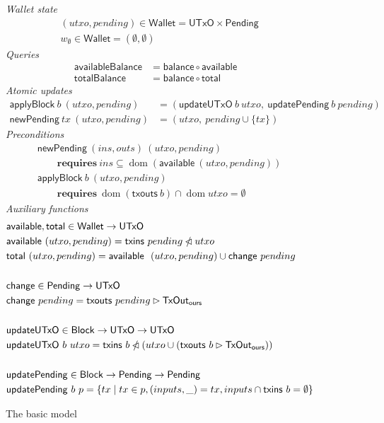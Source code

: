 \documentclass{article}
\newcommand{\restrictdom}{\lhd}
\newcommand{\subtractdom}{\mathbin{\slashed{\restrictdom}}}
\newcommand{\restrictrange}{\rhd}
\DeclareMathOperator{\dom}{dom}
\numberwithin{equation}{lemma}
\begin{document}
\begin{figure}
\emph{Wallet state}
\begin{align*}
& (\mathit{utxo}, \mathit{pending}) \in \mathsf{Wallet} = \mathsf{UTxO} \times \mathsf{Pending} \\
& w_\emptyset \in \mathsf{Wallet} = (\emptyset, \emptyset)
\end{align*}
%
\emph{Queries}
%
\begin{equation*}
\begin{split}
\mathsf{availableBalance} & = \mathsf{balance} \circ \mathsf{available} \\
\mathsf{totalBalance}     & = \mathsf{balance} \circ \mathsf{total}
\end{split}
\end{equation*}
%
\emph{Atomic updates}
%
\begin{align*}
    \mathsf{applyBlock} ~ b ~ (utxo, pending)
& = (\mathsf{updateUTxO} ~ b ~ utxo, ~ \mathsf{updatePending} ~ b ~ pending)
\\
  \mathsf{newPending} ~ tx ~ (utxo, pending)
& = ( utxo, ~ pending \cup \{ tx \} )
\end{align*}
%
\emph{Preconditions}
%
\begin{align*}
& \mathsf{newPending} ~ (\mathit{ins}, \mathit{outs}) ~ (\mathit{utxo}, \mathit{pending}) \\
& \qquad \mathbf{requires~} \mathit{ins} \subseteq \dom (\mathsf{available} ~ (utxo, pending))
\\
& \mathsf{applyBlock} ~ b ~ (\mathit{utxo}, \mathit{pending}) \\
& \qquad \mathbf{requires~} \dom (\mathsf{txouts} ~ b) \cap \dom \mathit{utxo} = \emptyset
\end{align*}
%
\emph{Auxiliary functions}
%
\begin{align*}
& \mathsf{available}, \mathsf{total} \in \mathsf{Wallet} \to \mathsf{UTxO} \\
& \mathsf{available} ~ (utxo, pending) = \mathsf{txins} ~ pending \subtractdom utxo \\
& \mathsf{total} ~ (utxo, pending) = \mathsf{available} ~ ~ (utxo, pending) \cup \mathsf{change} ~ pending \\
\\
& \mathsf{change} \in \mathsf{Pending} \to \mathsf{UTxO} \\
& \mathsf{change} ~ pending = \mathsf{txouts} ~ pending \restrictrange \mathsf{TxOut_{ours}} \\
\\
& \mathsf{updateUTxO} \in \mathsf{Block} \to \mathsf{UTxO} \to \mathsf{UTxO} \\
& \mathsf{updateUTxO} ~ b ~ utxo = \mathsf{txins} ~ b \subtractdom (utxo \cup (\mathsf{txouts} ~ b \restrictrange \mathsf{TxOut_{ours}})) \\
\\
& \mathsf{updatePending} \in \mathsf{Block} \to \mathsf{Pending} \to \mathsf{Pending} \\
& \mathsf{updatePending} ~ b ~ p = \{ tx \mid tx \in p, (inputs, \_) = tx, inputs \cap \mathsf{txins} ~ b = \emptyset \}
\end{align*}
%
\caption{\label{fig:basic_model}The basic model}
\end{figure}
\end{document}
